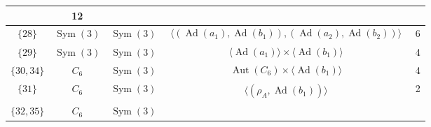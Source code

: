\documentclass[dvipsnames]{article}
\theoremstyle{definition}
\theoremstyle{remark}
\DeclareMathOperator{\Sym}{Sym}
\DeclareMathOperator{\Aut}{Aut}
\DeclareMathOperator{\Ad}{Ad}
\begin{document}
\begin{longtable}{ |c|c|c|c|c|}
    &12\\
    \hline
    $\{28\}$
    &
    $\Sym(3)$
    &
    $\Sym(3)$
    &
    \begin{minipage}{3.5cm}
        {
        \vspace{-2.5mm}
        \begin{align*}
            \langle \left(\Ad(a_1), \Ad(b_1) \right), \left(\Ad(a_2), \Ad(b_2) \right) \rangle
        \end{align*}
        \vspace{-5mm}
        }
    \end{minipage}
    &6\\
    \hline
    $\{29\}$
    &
    $\Sym(3)$
    &
    $\Sym(3)$
    &
    \begin{minipage}{3.5cm}
        {
        \vspace{-2.5mm}
        \begin{align*}
            \langle \Ad(a_1) \rangle \times \langle \Ad(b_1) \rangle
        \end{align*}
        \vspace{-5mm}
        }
    \end{minipage}
    &4\\
    \hline
    $\{30,34\}$
    &
    $C_6$
    &
    $\Sym(3)$
    &
    \begin{minipage}{3.5cm}
        {
        \vspace{-2.5mm}
        \begin{align*}
            \Aut(C_6) \times \langle \Ad(b_1) \rangle
        \end{align*}
        \vspace{-5mm}
        }
    \end{minipage}
    &4\\
    \hline
    $\{31\}$
    &
    $C_6$
    &
    $\Sym(3)$
    &
    \begin{minipage}{3.5cm}
        {
        \vspace{-2.5mm}
        \begin{align*}
            \langle \left(\rho_A, \Ad(b_1) \right) \rangle
        \end{align*}
        \vspace{-5mm}
        }
    \end{minipage}
    &2\\
    \hline
    $\{32, 35\}$
    &
    $C_6$
    &
    $\Sym(3)$
    &
    \begin{minipage}{3.5cm}
        {
        \vspace{-2.5mm}
        \begin{align*}

\end{align*}}
\end{minipage}
\end{longtable}
\end{document}
